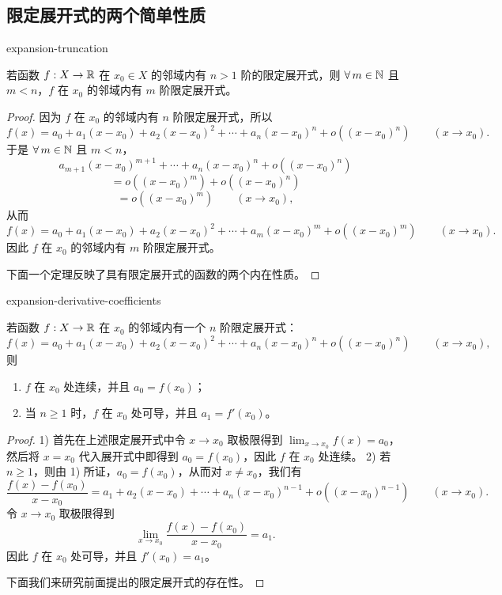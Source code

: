 \subsection{限定展开式的两个简单性质}

\begin{mythm}{}{expansion-truncation}

若函数 $f:X\to\mathbb{R}$ 在 $x_0\in X$ 的邻域内有 $n>1$ 阶的限定展开式，则 $\forall\,m\in\mathbb{N}$ 且 $m<n$，$f$ 在 $x_0$ 的邻域内有 $m$ 阶限定展开式。

\end{mythm}

\begin{proof}

因为 $f$ 在 $x_0$ 的邻域内有 $n$ 阶限定展开式，所以
\[f(x)=a_0+a_1(x-x_0)+a_2(x-x_0)^2+\cdots+a_n(x-x_0)^n+o((x-x_0)^n)\qquad(x\to x_0).\]
于是 $\forall\,m\in\mathbb{N}$ 且 $m<n$，
\[a_{m+1}(x-x_0)^{m+1}+\cdots+a_n(x-x_0)^n+o((x-x_0)^n)\]
\[=o((x-x_0)^m)+o((x-x_0)^n)\]
\[=o((x-x_0)^m)\qquad(x\to x_0),\]
从而
\[f(x)=a_0+a_1(x-x_0)+a_2(x-x_0)^2+\cdots+a_m(x-x_0)^m+o((x-x_0)^m)\qquad(x\to x_0).\]
因此 $f$ 在 $x_0$ 的邻域内有 $m$ 阶限定展开式。

下面一个定理反映了具有限定展开式的函数的两个内在性质。

\end{proof}

\begin{mythm}{}{expansion-derivative-coefficients}

若函数 $f:X\to\mathbb{R}$ 在 $x_0$ 的邻域内有一个 $n$ 阶限定展开式：
\[f(x)=a_0+a_1(x-x_0)+a_2(x-x_0)^2+\cdots+a_n(x-x_0)^n+o((x-x_0)^n)\qquad(x\to x_0),\]
则
\begin{enumerate}[label=\arabic{enumi})]
\item $f$ 在 $x_0$ 处连续，并且 $a_0=f(x_0)$；
\item 当 $n\geqslant1$ 时，$f$ 在 $x_0$ 处可导，并且 $a_1=f'(x_0)$。
\end{enumerate}

\end{mythm}

\begin{proof}

1) 首先在上述限定展开式中令 $x\to x_0$ 取极限得到 $\displaystyle\lim_{x\to x_0}f(x)=a_0$，然后将 $x=x_0$ 代入展开式中即得到 $a_0=f(x_0)$，因此 $f$ 在 $x_0$ 处连续。
2) 若 $n\geqslant1$，则由 1) 所证，$a_0=f(x_0)$，从而对 $x\neq x_0$，我们有
\[\frac{f(x)-f(x_0)}{x-x_0}=a_1+a_2(x-x_0)+\cdots+a_n(x-x_0)^{n-1}+o((x-x_0)^{n-1})\qquad(x\to x_0).\]
令 $x\to x_0$ 取极限得到
\[\lim_{x\to x_0}\frac{f(x)-f(x_0)}{x-x_0}=a_1.\]
因此 $f$ 在 $x_0$ 处可导，并且 $f'(x_0)=a_1$。

下面我们来研究前面提出的限定展开式的存在性。

\end{proof}

